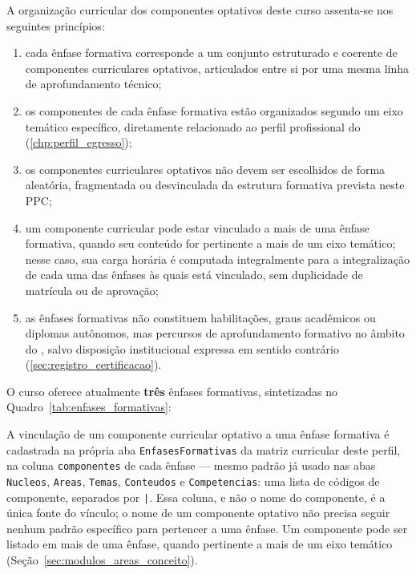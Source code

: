 A organização curricular dos componentes optativos deste curso assenta-se nos seguintes princípios:

\begin{enumerate}
    \item cada ênfase formativa corresponde a um conjunto estruturado e coerente de componentes curriculares optativos, articulados entre si por uma mesma linha de aprofundamento técnico;
    \item os componentes de cada ênfase formativa estão organizados segundo um eixo temático específico, diretamente relacionado ao perfil profissional do \ppccurso (\autoref{chp:perfil_egresso});
    \item os componentes curriculares optativos não devem ser escolhidos de forma aleatória, fragmentada ou desvinculada da estrutura formativa prevista neste PPC;
    \item um componente curricular pode estar vinculado a mais de uma ênfase formativa, quando seu conteúdo for pertinente a mais de um eixo temático; nesse caso, sua carga horária é computada integralmente para a integralização de cada uma das ênfases às quais está vinculado, sem duplicidade de matrícula ou de aprovação;
    \item as ênfases formativas não constituem habilitações, graus acadêmicos ou diplomas autônomos, mas percursos de aprofundamento formativo no âmbito do \ppccurso, salvo disposição institucional expressa em sentido contrário (\autoref{sec:registro_certificacao}).
\end{enumerate}

O curso oferece atualmente \textbf{três} ênfases formativas, sintetizadas no Quadro~\ref{tab:enfases_formativas}:



A vinculação de um componente curricular optativo a uma ênfase formativa é cadastrada na própria aba \texttt{EnfasesFormativas} da matriz curricular deste perfil, na coluna \texttt{componentes} de cada ênfase — mesmo padrão já usado nas abas \texttt{Nucleos}, \texttt{Areas}, \texttt{Temas}, \texttt{Conteudos} e \texttt{Competencias}: uma lista de códigos de componente, separados por \texttt{|}. Essa coluna, e não o nome do componente, é a única fonte do vínculo; o nome de um componente optativo não precisa seguir nenhum padrão específico para pertencer a uma ênfase. Um componente pode ser listado em mais de uma ênfase, quando pertinente a mais de um eixo temático (Seção~\ref{sec:modulos_areas_conceito}).

